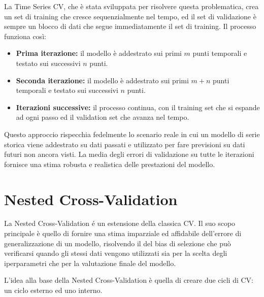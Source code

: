 \documentclass[a4paper,12pt]{report}
\begin{document}
	La Time Series CV, che è stata sviluppata per risolvere questa problematica, crea un set di training che cresce sequenzialmente nel tempo, ed il set di validazione è sempre un blocco di dati che segue immediatamente il set di training. Il processo funziona così:
	\begin{itemize}
		\item \textbf{Prima iterazione:} il modello è addestrato sui primi $m$ punti temporali e testato sui successivi $n$ punti.
		\item \textbf{Seconda iterazione:} il modello è addestrato sui primi $m+n$ punti temporali e testato sui successivi $n$ punti.
		\item \textbf{Iterazioni successive:} il processo continua, con il training set che si espande ad ogni passo ed il validation set che avanza nel tempo.
	\end{itemize}
	Questo approccio rispecchia fedelmente lo scenario reale in cui un modello di serie storica viene addestrato su dati passati e utilizzato per fare previsioni su dati futuri non ancora visti. La media degli errori di validazione su tutte le iterazioni fornisce una stima robusta e realistica delle prestazioni del modello.
	
	\section{Nested Cross-Validation}
	
	La Nested Cross-Validation é un estensione della classica CV. Il suo scopo principale è quello di fornire una stima imparziale ed affidabile dell'errore di generalizzazione di un modello, risolvendo il del bias di selezione che può verificarsi quando gli stessi dati vengono utilizzati sia per la scelta degli iperparametri che per la valutazione finale del modello.
	
	L'idea alla base della Nested Cross-Validation è quella di creare due cicli di CV: un ciclo esterno ed uno interno. 
	
\end{document}
